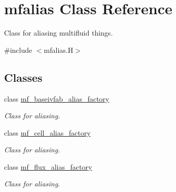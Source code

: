 \hypertarget{classmfalias}{}\section{mfalias Class Reference}
\label{classmfalias}


Class for aliasing multifluid things.  




{\ttfamily \#include $<$mfalias.\+H$>$}

\subsection*{Classes}
\begin{DoxyCompactItemize}
\item 
class \hyperlink{classmfalias_1_1mf__baseivfab__alias__factory}{mf\+\_\+baseivfab\+\_\+alias\+\_\+factory}
\begin{DoxyCompactList}\small\item\em Class for aliasing. \end{DoxyCompactList}\item 
class \hyperlink{classmfalias_1_1mf__cell__alias__factory}{mf\+\_\+cell\+\_\+alias\+\_\+factory}
\begin{DoxyCompactList}\small\item\em Class for aliasing. \end{DoxyCompactList}\item 
class \hyperlink{classmfalias_1_1mf__flux__alias__factory}{mf\+\_\+flux\+\_\+alias\+\_\+factory}
\begin{DoxyCompactList}\small\item\em Class for aliasing. \end{DoxyCompactList}\end{DoxyCompactItemize}
